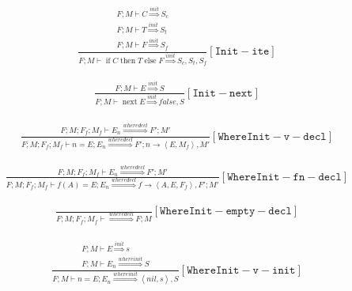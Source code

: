 \documentclass{scrartcl}
\DeclareMathOperator{\ifop}{if}
\DeclareMathOperator{\thenop}{then}
\DeclareMathOperator{\elseop}{else}
\DeclareMathOperator{\nextop}{next}
\begin{document}
    \begin{align*}
    \frac{
        \begin{matrix}
        F; M \vdash C \overset{init}{\Rightarrow} S_c \\
        F; M \vdash T \overset{init}{\Rightarrow} S_t \\
        F; M \vdash F \overset{init}{\Rightarrow} S_f
        \end{matrix}
    }{
        F; M \vdash \ifop C \thenop T \elseop F \overset{init}{\Rightarrow} S_c, S_t, S_f
    }[\mathtt{Init-ite}]
    \end{align*}
    
    \begin{align*}
    \frac{
        F; M \vdash E \overset{init}{\Rightarrow} S
    }{
        F; M \vdash \nextop E \overset{init}{\Rightarrow} false, S
    }[\mathtt{Init-next}]
    \end{align*}
    
    \begin{align*}
    \frac{
        \begin{matrix}
        F; M; F_f; M_f \vdash E_n \overset{wheredecl}{\Rightarrow} F'; M'
        \end{matrix}
    }{
        F; M; F_f; M_f \vdash n = E; E_n \overset{wheredecl}{\Rightarrow} F'; n \to \left< E, M_f \right>, M'
    }[\mathtt{WhereInit-v-decl}]
    \end{align*}
    
    \begin{align*}
    \frac{
        F; M; F_f; M_f \vdash E_n \overset{wheredecl}{\Rightarrow} F'; M'
    }{
        F; M; F_f; M_f \vdash f(A) = E; E_n \overset{wheredecl}{\Rightarrow} f \to \left<A, E, F_f \right>, F'; M'
    }[\mathtt{WhereInit-fn-decl}]
    \end{align*}
    
    \begin{align*}
    \frac{}{
        F; M; F_f; M_f \vdash \overset{wheredecl}{\Rightarrow} F; M
    }[\mathtt{WhereInit-empty-decl}]
    \end{align*}
    
    \begin{align*}
    \frac{
        \begin{matrix}
        F; M \vdash E \overset{init}{\Rightarrow} s \\
        F; M \vdash E_n \overset{whereinit}{\Rightarrow} S
        \end{matrix}
    }{
        F; M \vdash n = E; E_n \overset{whereinit}{\Rightarrow} \left<nil, s\right>, S
    }[\mathtt{WhereInit-v-init}]
    \end{align*}
    
\end{document}
